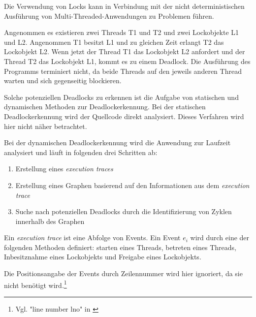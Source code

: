 Die Verwendung von Locks kann in Verbindung mit der nicht deterministischen
Ausführung von Multi-Threaded-Anwendungen zu Problemen führen.

Angenommen es existieren zwei Threads \textrm{T1} und \textrm{T2} und zwei
Lockobjekte \textrm{L1} und \textrm{L2}. Angenommen \textrm{T1} besitzt
\textrm{L1} und zu gleichen Zeit erlangt \textrm{T2} das Lockobjekt \textrm{L2}.
Wenn jetzt der Thread \textrm{T1} das Lockobjekt \textrm{L2} anfordert und der
Thread \textrm{T2} das Lockobjekt \textrm{L1}, kommt es zu einem
Deadlock.\autocite[vgl.][70]{coffman1971system} Die Ausführung des Programms
terminiert nicht, da beide Threads auf den jeweils anderen Thread warten und
sich gegenseitig blockieren.

Solche potenziellen Deadlocks zu erkennen ist die Aufgabe von statischen und
dynamischen Methoden zur Deadlockerkennung. Bei der statischen Deadlockerkennung
wird der Quellcode direkt analysiert. Dieses Verfahren wird hier nicht näher
betrachtet.

Bei der dynamischen Deadlockerkennung wird die Anwendung zur Laufzeit analysiert
und läuft in folgenden drei Schritten
ab:\autocite[vgl.][212-213]{bensalem2005dynamic}
\begin{enumerate}
  \item Erstellung eines \emph{execution traces}
  \item Erstellung eines Graphen basierend auf den Informationen aus dem \emph{execution trace}
  \item Suche nach potenziellen Deadlocks durch die Identifizierung von Zyklen
  innerhalb des Graphen
\end{enumerate}
Ein \emph{execution trace} ist eine Abfolge von Events. Ein Event \textrm{$e_i$}
wird durch eine der folgenden Methoden definiert: starten eines Threads,
betreten eines Threads, Inbesitznahme eines Lockobjekts und Freigabe eines
Lockobjekts.\autocite[vgl.][212]{bensalem2005dynamic}

Die Positionsangabe der Events durch Zeilennummer wird hier ignoriert, da sie
nicht benötigt wird.\footnote{Vgl. "line number lno" in
\autocite[212]{bensalem2005dynamic}}


